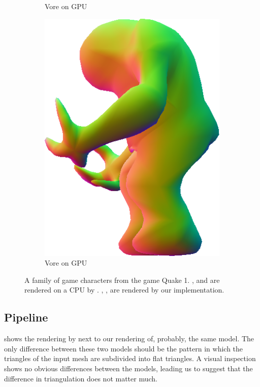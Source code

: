 \begin{figure}
\begin{subfigure}[b]{0.2\textwidth}
		\caption{Vore on GPU}
		\label{fig:results:cpugpu:gpuVore}
	\end{subfigure}	
	\hspace{0.1\textwidth}
	\begin{subfigure}[b]{0.2\textwidth}
		\centering
		\includegraphics[width=\textwidth]{content/img/results/shamblerGPU.png}
		\caption{Vore on GPU}
		\label{fig:results:cpugpu:gpuShambler}
	\end{subfigure}			
	\caption{A family of game characters from the game Quake 1. ,  and  are rendered on a CPU by \citeauthor{vlachos2001curved}. , ,  are rendered by our implementation.}
	\label{fig:results:cpugpu}
\end{figure}

\subsection{Pipeline}
	 shows the rendering by \citeauthor{vlachos2001curved} next to our rendering of, probably, the same model. The only difference between these two models should be the pattern in which the triangles of the input mesh are subdivided into flat triangles. A visual inspection shows no obvious differences between the models, leading us to suggest that the difference in triangulation does not matter much. 